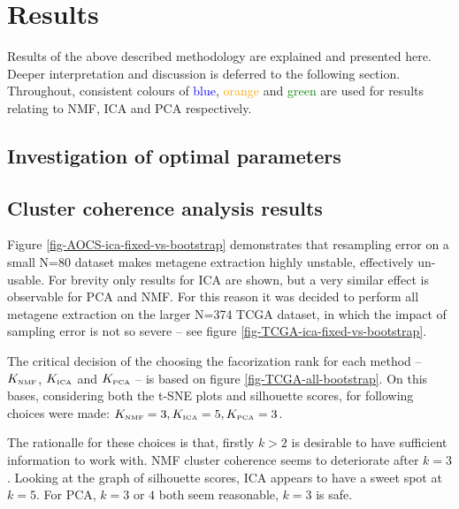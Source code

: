 \documentclass[tikz, 12pt,a4paper,oneside,fleqn]{article}
\begin{document}

\section{Results}

Results of the above described methodology are explained and presented here.   Deeper interpretation and discussion is deferred to the following section.  Throughout, consistent colours of \textcolor{blue}{blue}, \textcolor{orange}{orange} and \textcolor{green}{green} are used for results relating to NMF, ICA and PCA respectively.

\subsection{Investigation of optimal parameters}

\subsection{Cluster coherence analysis results}

Figure \ref{fig-AOCS-ica-fixed-vs-bootstrap} demonstrates that resampling error on a small N=80 dataset makes metagene extraction highly unstable, effectively un-usable.  For brevity only results for ICA are shown, but a very similar effect is observable for PCA and NMF.   For this reason it was decided to perform all metagene extraction on the larger N=374 TCGA dataset, in which the impact of sampling error is not so severe -- see figure \ref{fig-TCGA-ica-fixed-vs-bootstrap}.  

The critical decision of the choosing the facorization rank for each method -- $K_{\mbox{\tiny NMF}}$, $K_{\mbox{\tiny ICA}}$ and $K_{\mbox{\tiny PCA}}$ -- is based on figure \ref{fig-TCGA-all-bootstrap}.   On this bases, considering both the t-SNE plots and silhouette scores, for following choices were made:
$K_{\mbox{\tiny NMF}}  =  3,
K_{\mbox{\tiny ICA}}  =  5,
K_{\mbox{\tiny PCA}}  =  3$.

The rationalle for these choices is that, firstly $k>2$ is desirable to have sufficient information to work with.  NMF cluster coherence seems to deteriorate after $k=3$.   Looking at the graph of silhouette scores, ICA appears to have a sweet spot at $k=5$.  For PCA, $k = 3$ or $4$ both seem reasonable, $k=3$ is safe.
\end{document}
